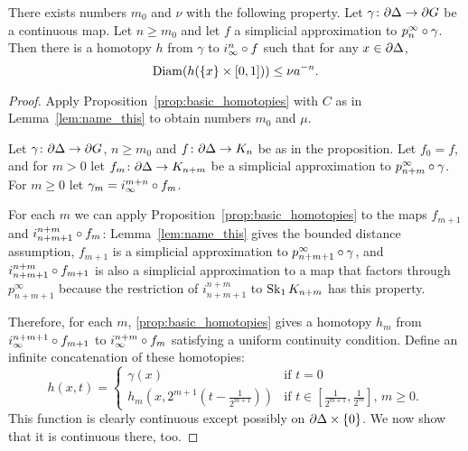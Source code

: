 \documentclass[a4paper]{article}
\begin{document}
\begin{proposition}\label{prop:uniform_homotopies}
  There exists numbers $m_0$ and $\nu$ with the following property. Let
  $\gamma\colon\partial\Delta\to\partial G$ be a continuous map. Let $n \geq
  m_0$ and let $f$ a simplicial approximation to $p^\infty_n\circ\gamma$.
  Then there is a homotopy $h$ from $\gamma$ to $i^n_\infty\circ f$ such
  that for any $x \in \partial\Delta$,
  \begin{equation*}
    \operatorname{Diam}(h(\{x\}\times [0,1])) \leq \nu a^{-n}.
  \end{equation*}
\end{proposition}

\begin{proof}
  Apply Proposition~\ref{prop:basic_homotopies} with $C$ as in
  Lemma~\ref{lem:name_this} to obtain numbers $m_0$ and $\mu$.
  
  Let $\gamma\colon\partial\Delta\to\partial G$, $n\geq m_0$ and
  $f\colon\partial\Delta\to K_n$ be as in the proposition. Let $f_0 = f$,
  and for $m > 0$ let $f_m\colon\partial\Delta\to K_{n+m}$ be a
  simplicial approximation to $p^\infty_{n+m}\circ\gamma$. For $m \geq 0$
  let $\gamma_m = i^{m+n}_\infty\circ f_m$. 

  For each $m$ we can apply Proposition~\ref{prop:basic_homotopies} to the maps
  $f_{m+1}$ and $i^{n+m}_{n+m+1}\circ f_m$: Lemma~\ref{lem:name_this} gives
  the bounded distance assumption, $f_{m+1}$ is a simplicial approximation to
  $p^\infty_{n+m+1}\circ\gamma$, and $i^{n+m}_{n+m+1}\circ f_{m+1}$ is
  also a simplicial approximation to a map that factors through
  $p^\infty_{n+m+1}$ because the restriction of $i^{n+m}_{n+m+1}$ to $\operatorname{Sk}_1
  K_{n+m}$ has this property.

  Therefore, for each $m$, \cref{prop:basic_homotopies} gives a homotopy $h_m$
  from $i^{n+m+1}_\infty\circ f_{m+1}$ to $i^{n+m}_\infty \circ f_m$
  satisfying a uniform continuity condition. Define an infinite concatenation
  of these homotopies:
  \begin{equation*}
    h(x,t) = 
    \begin{cases}
      \gamma(x) & \text{if } t = 0\\
      h_m\left(x,2^{m+1}\left(t-\frac{1}{2^{m+1}}\right)\right) 
              & \text{if $t \in \left[\frac{1}{2^{m+1}}, \frac{1}{2^m}\right]$
                    , $m\geq 0$}.
    \end{cases}
  \end{equation*}
  This function is clearly continuous except possibly on
  $\partial\Delta\times\{0\}$. We now show that it is continuous there, too.


\end{proof}
\end{document}
